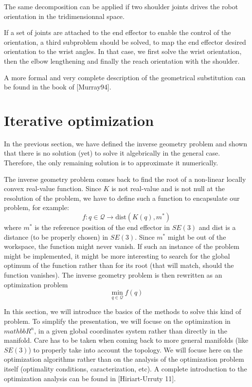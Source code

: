 \documentclass{book}
\begin{document}
The same decomposition can be applied if two shoulder joints drives the robot orientation in the tridimensionnal space. 

If a set of joints are attached to the end effector to enable the control of the orientation, a third subproblem should be solved, to map the end effector desired orientation to the wrist angles. In that case, we first solve the wrist orientation, then the elbow lengthening and finally the reach orientation with the shoulder.

A more formal and very complete description of the geometrical substitution can be found in the book of [Murray94].


\chapter{Iterative optimization} \label{sec:numeric}

In the previous section, we have defined the inverse geometry problem and shown that there is no solution (yet) to solve it algebrically in the general case. Therefore, the only remaining solution is to approximate it numerically.

The inverse geometry problem comes back to find the root of a non-linear locally convex real-value function. Since $K$ is not real-value and is not null at the resolution of the problem, we have to define such a function to encapsulate our problem, for example:
\[ f: q \in \mathcal{Q}  \rightarrow \textrm{dist}(K(q),m^*)  \]
where $m^*$ is the reference position of the end effector in $SE(3)$ and dist is a distance (to be properly chosen) in $SE(3)$. Since $m^*$ might be out of the workspace, the function might never vanish. If such an instance of the problem might be implemented, it might be more interesting to search for the global optimum of the function rather than for its root (that will match, should the function vanishes). The inverse geometry problem is then rewritten as an optimization problem
\[  \min_{q \in \mathcal{Q}} f(q) \]

In this section, we will introduce the basics of the methods to solve this kind of problem. To simplify the presentation, we will focuse on the optimization in $mathbb{R}^n$, \mie in a given global coordinates system rather than directly in the manifold. Care has to be taken when coming back to more general manifolds (like $SE(3)$) to properly take into account the topology. We will focuse here on the optimization algorithms rather than on the analysis of the optimization problem itself (optimality conditions, caracterization, etc). A complete introduction to the optimization analysis can be found in [Hiriart-Urruty 11].
\end{document}
